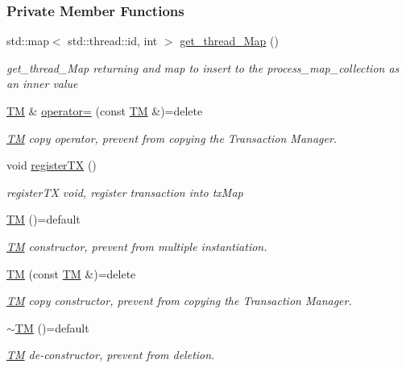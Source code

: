 \subsubsection*{Private Member Functions}
\begin{DoxyCompactItemize}
\item 
std\+::map$<$ std\+::thread\+::id, int $>$ \hyperlink{class_t_m_afb8bc9f42fe06c52747beb7f4c46915c_afb8bc9f42fe06c52747beb7f4c46915c}{get\+\_\+thread\+\_\+\+Map} ()
\begin{DoxyCompactList}\small\item\em get\+\_\+thread\+\_\+\+Map returning and map to insert to the process\+\_\+map\+\_\+collection as an inner value \end{DoxyCompactList}\item 
\hyperlink{class_t_m}{TM} \& \hyperlink{class_t_m_a85a6b783f0566f0877bab6a7de977c0a_a85a6b783f0566f0877bab6a7de977c0a}{operator=} (const \hyperlink{class_t_m}{TM} \&)=delete
\begin{DoxyCompactList}\small\item\em \hyperlink{class_t_m}{TM} copy operator, prevent from copying the Transaction Manager. \end{DoxyCompactList}\item 
void \hyperlink{class_t_m_a26ea481c24d9aa3aebd6dafb7253376e_a26ea481c24d9aa3aebd6dafb7253376e}{register\+TX} ()
\begin{DoxyCompactList}\small\item\em register\+TX void, register transaction into tx\+Map \end{DoxyCompactList}\item 
\hyperlink{class_t_m_a9b5afb6b9d7c5925ab5cc5c65078ac23_a9b5afb6b9d7c5925ab5cc5c65078ac23}{TM} ()=default
\begin{DoxyCompactList}\small\item\em \hyperlink{class_t_m}{TM} constructor, prevent from multiple instantiation. \end{DoxyCompactList}\item 
\hyperlink{class_t_m_a2d1de4a19f7ed6b2805ed6e955b8e45b_a2d1de4a19f7ed6b2805ed6e955b8e45b}{TM} (const \hyperlink{class_t_m}{TM} \&)=delete
\begin{DoxyCompactList}\small\item\em \hyperlink{class_t_m}{TM} copy constructor, prevent from copying the Transaction Manager. \end{DoxyCompactList}\item 
\hyperlink{class_t_m_a985f8cb24f685925ddd637c7030cd2b3_a985f8cb24f685925ddd637c7030cd2b3}{$\sim$\+TM} ()=default
\begin{DoxyCompactList}\small\item\em \hyperlink{class_t_m}{TM} de-\/constructor, prevent from deletion. \end{DoxyCompactList}\end{DoxyCompactItemize}
